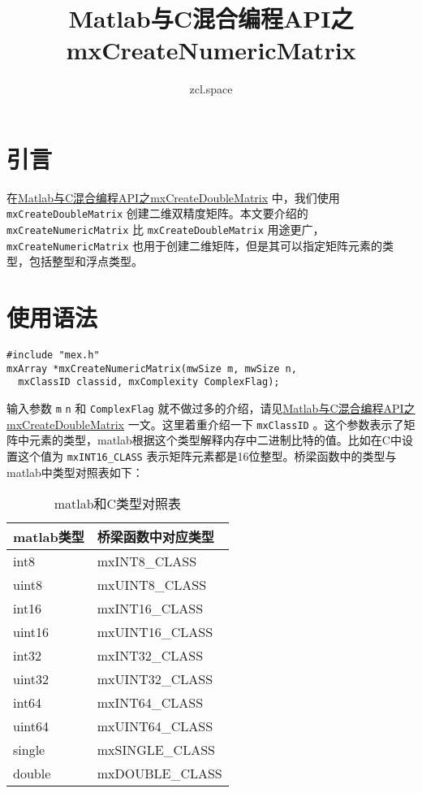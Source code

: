 \documentclass[10pt,a4paper,UTF8]{article}
\author{zcl.space}
\date{}
\title{Matlab与C混合编程API之mxCreateNumericMatrix}
\begin{document}
\maketitle\xiaosihao
\tableofcontents\newpage\newpage


\section{引言}
\label{sec:orgheadline1}


在\href{matlabmxCreateDoulbeMatrix.org}{Matlab与C混合编程API之mxCreateDoubleMatrix} 中，我们使用 \texttt{mxCreateDoubleMatrix} 创建二维双精度矩阵。本文要介绍的 \texttt{mxCreateNumericMatrix} 比  \texttt{mxCreateDoubleMatrix} 用途更广， \texttt{mxCreateNumericMatrix} 也用于创建二维矩阵，但是其可以指定矩阵元素的类型，包括整型和浮点类型。
\section{使用语法}
\label{sec:orgheadline2}


\lstset{language=C,label= ,caption= ,captionpos=b,numbers=none}
\begin{lstlisting}
#include "mex.h"
mxArray *mxCreateNumericMatrix(mwSize m, mwSize n,
  mxClassID classid, mxComplexity ComplexFlag);
\end{lstlisting}

输入参数 \texttt{m} \texttt{n} 和 \texttt{ComplexFlag} 就不做过多的介绍，请见\href{matlabmxCreateDoulbeMatrix.org}{Matlab与C混合编程API之mxCreateDoubleMatrix} 一文。这里着重介绍一下 \texttt{mxClassID} 。这个参数表示了矩阵中元素的类型，matlab根据这个类型解释内存中二进制比特的值。比如在C中设置这个值为 \texttt{mxINT16\_CLASS} 表示矩阵元素都是16位整型。桥梁函数中的类型与matlab中类型对照表如下：
\begin{table}[htb]
\caption{\label{tab:orgtable1}
matlab和C类型对照表}
\centering
\begin{tabular}{ll}
\hline
matlab类型 & 桥梁函数中对应类型\\
\hline
int8 & mxINT8\_CLASS\\
uint8 & mxUINT8\_CLASS\\
int16 & mxINT16\_CLASS\\
uint16 & mxUINT16\_CLASS\\
int32 & mxINT32\_CLASS\\
uint32 & mxUINT32\_CLASS\\
int64 & mxINT64\_CLASS\\
uint64 & mxUINT64\_CLASS\\
single & mxSINGLE\_CLASS\\
double & mxDOUBLE\_CLASS\\
\hline
\end{tabular}
\end{table}
\end{document}
